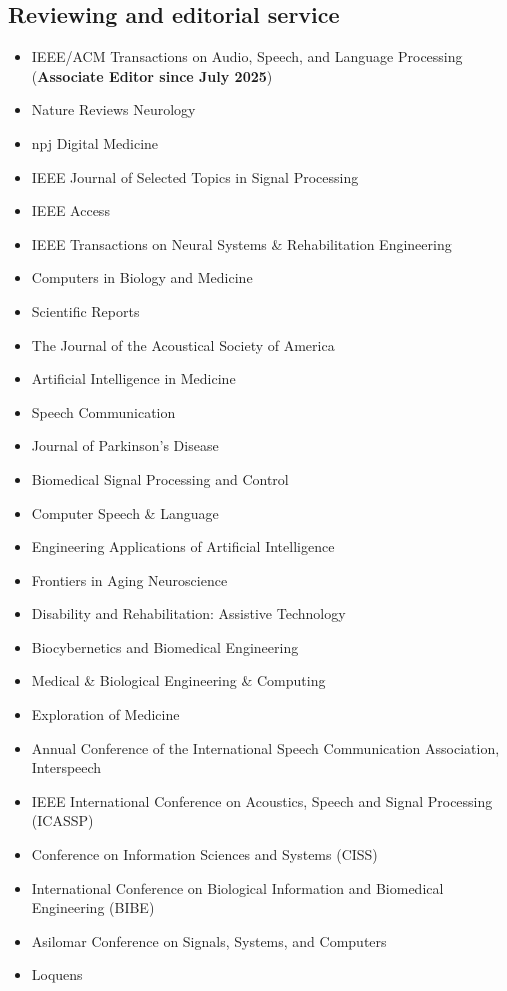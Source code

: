 \subsection{Reviewing and editorial service}
\begin{itemize}
  \item IEEE/ACM Transactions on Audio, Speech, and Language Processing (\textbf{Associate Editor since July 2025})
  \item Nature Reviews Neurology
  \item npj Digital Medicine
  \item IEEE Journal of Selected Topics in Signal Processing
  \item IEEE Access
  \item IEEE Transactions on Neural Systems \& Rehabilitation Engineering
  \item Computers in Biology and Medicine
  \item Scientific Reports
  \item The Journal of the Acoustical Society of America
  \item Artificial Intelligence in Medicine
  \item Speech Communication
  \item Journal of Parkinson’s Disease
  \item Biomedical Signal Processing and Control
  \item Computer Speech \& Language
  \item Engineering Applications of Artificial Intelligence
  \item Frontiers in Aging Neuroscience
  \item Disability and Rehabilitation: Assistive Technology
  \item Biocybernetics and Biomedical Engineering
  \item Medical \& Biological Engineering \& Computing
  \item Exploration of Medicine
  \item Annual Conference of the International Speech Communication Association, Interspeech
  \item IEEE International Conference on Acoustics, Speech and Signal Processing (ICASSP)
  \item Conference on Information Sciences and Systems (CISS)
  \item International Conference on Biological Information and Biomedical Engineering (BIBE)
  \item Asilomar Conference on Signals, Systems, and Computers
  \item Loquens
\end{itemize}

